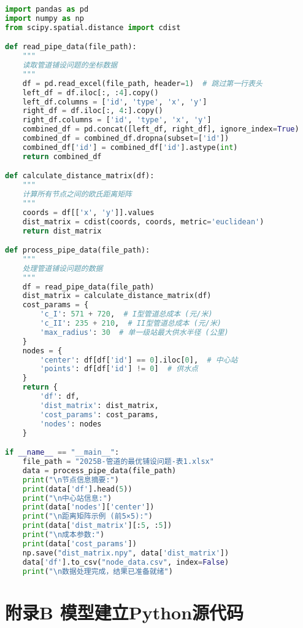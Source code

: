 \documentclass[12pt,a4paper]{article}
\begin{document}
\begin{lstlisting}[language=Python]
import pandas as pd
import numpy as np
from scipy.spatial.distance import cdist

def read_pipe_data(file_path):
    """
    读取管道铺设问题的坐标数据
    """
    df = pd.read_excel(file_path, header=1)  # 跳过第一行表头
    left_df = df.iloc[:, :4].copy()
    left_df.columns = ['id', 'type', 'x', 'y']
    right_df = df.iloc[:, 4:].copy()
    right_df.columns = ['id', 'type', 'x', 'y']
    combined_df = pd.concat([left_df, right_df], ignore_index=True)
    combined_df = combined_df.dropna(subset=['id'])
    combined_df['id'] = combined_df['id'].astype(int)
    return combined_df

def calculate_distance_matrix(df):
    """
    计算所有节点之间的欧氏距离矩阵
    """
    coords = df[['x', 'y']].values
    dist_matrix = cdist(coords, coords, metric='euclidean')
    return dist_matrix

def process_pipe_data(file_path):
    """
    处理管道铺设问题的数据
    """
    df = read_pipe_data(file_path)
    dist_matrix = calculate_distance_matrix(df)
    cost_params = {
        'c_I': 571 + 720,  # I型管道总成本 (元/米)
        'c_II': 235 + 210,  # II型管道总成本 (元/米)
        'max_radius': 30  # 单一级站最大供水半径 (公里)
    }
    nodes = {
        'center': df[df['id'] == 0].iloc[0],  # 中心站
        'points': df[df['id'] != 0]  # 供水点
    }
    return {
        'df': df,
        'dist_matrix': dist_matrix,
        'cost_params': cost_params,
        'nodes': nodes
    }

if __name__ == "__main__":
    file_path = "2025B-管道的最优铺设问题-表1.xlsx"
    data = process_pipe_data(file_path)
    print("\n节点信息摘要:")
    print(data['df'].head(5))
    print("\n中心站信息:")
    print(data['nodes']['center'])
    print("\n距离矩阵示例 (前5×5):")
    print(data['dist_matrix'][:5, :5])
    print("\n成本参数:")
    print(data['cost_params'])
    np.save("dist_matrix.npy", data['dist_matrix'])
    data['df'].to_csv("node_data.csv", index=False)
    print("\n数据处理完成，结果已准备就绪")
\end{lstlisting}

\section*{附录B  模型建立Python源代码}
\end{document}
